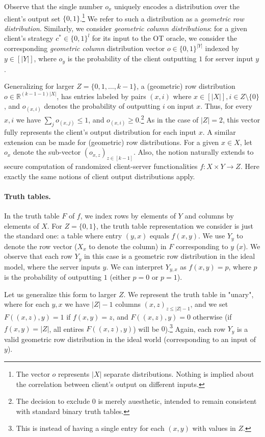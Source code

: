 \documentclass[a4paper]{article}
\begin{document}
Observe that the single number $o_x$ uniquely encodes a distribution over the client's output set $\{0,1\}$.\footnote{The vector $o$ represents $|X|$ separate distributions. Nothing is implied about the correlation between client's output on different inputs.} We refer to such a distribution as a \emph{geometric row distribution}. Similarly, we consider \emph{geometric column distributions}: for a given client's strategy $c^*\in\{0,1\}^l$ for its input to the OT oracle, we consider the corresponding \emph{geometric column} distribution vector $o\in \{0,1\}^{|Y|}$ indexed by  $y\in [|Y|]$, where $o_y$ is the probability of the client outputting $1$ for server input $y$.

Generalizing for larger $Z=\{0,1,\ldots,k-1\}$, a (geometric) row distribution $o\in \mathbb{R}^{(k-1-1)|X|}$, has entries labeled by
pairs $(x,i)$ where $x\in [|X|],i\in Z\setminus{\{0\}}$, and $o_{(x,i)}$ denotes the probability of outputting $i$ on input $x$. Thus, for every $x,i$ we have $\sum_j o_{(x,j)}\leq 1$, and $o_{(x,i)}\geq 0$.\footnote{The decision to exclude 0 is merely auesthetic, intended to remain consistent with standard binary truth tables.}
As in the case of $|Z|=2$, this vector fully represents the client's output distribution for each input $x$. A similar extension can be made for (geometric) row distributions. For a given $x\in X$, let $o_x$ denote the sub-vector $(o_{x,z})_{z\in [k-1]}$.
Also, the notion naturally extends to secure computation of randomized client-server functionalities $f:X\times Y\rightarrow Z$. Here exactly the same notions of client output distributions apply.

\paragraph{Truth tables.} In the truth table $F$ of $f$, we index rows by elements of $Y$ and columns by elements of $X$. For $Z=\{0,1\}$, the truth table representation we consider is just the standard one: a table where entry $(y,x)$ equals $f(x,y)$. We use $Y_y$ to denote the row vector ($X_x$ to denote the column) in $F$ corresponding to $y$ ($x$).
We observe that each row $Y_y$ in this case is a geometric row distribution in the ideal model, where the server inputs $y$. We can interpret $Y_{y,x}$ as $f(x,y) = p$, where $p$ is the probability of outputting $1$ (either $p=0$ or $p=1$). 


Let us generalize this form to larger $Z$. We represent the truth table in "unary", where for each $y,x$ we have $|Z|-1$ columns $(x,z)_{z\leq |Z|-1}$, and we set $F((x,z),y)=1$
if $f(x,y)=z$, and $F((x,z),y)=0$ otherwise (if $f(x,y)=|Z|$, all entires $F((x,z),y)$) will be $0$).\footnote{This is instead of having a single entry for each $(x,y)$ with values in $Z$.}
Again, each row $Y_y$ is a valid geometric row distribution in the ideal world (corresponding to an input of $y$).
\end{document}
